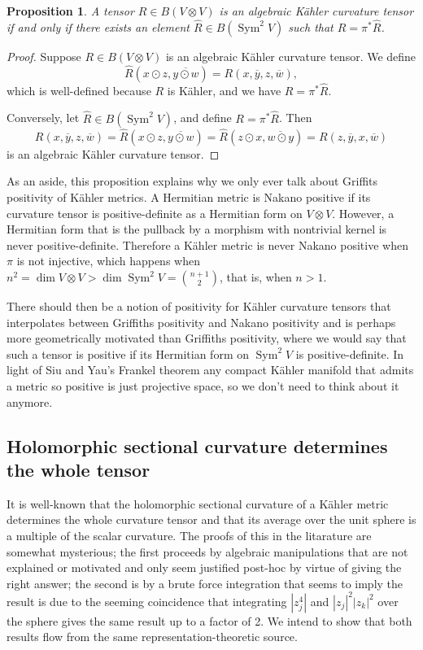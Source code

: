 \documentclass[10pt,a4paper]{amsart}
\newtheorem{prop}[theo]{Proposition}
\theoremstyle{definition}
\def\ov#1{\overline{#1}}
\DeclareMathOperator{\Sym}{Sym}
\begin{document}
\begin{prop}
A tensor $R \in B(V \otimes V)$ is an algebraic K\"ahler curvature tensor
if and only if there exists an element $\hat R \in B(\Sym^2 V)$ such that $R =
\pi^* \hat R$.
\end{prop}

\begin{proof}
Suppose $R \in B(V \otimes V)$ is an algebraic K\"ahler curvature tensor.
We define
$$
\hat R(x \odot z, \ov{y \odot w})
= R(x, \ov y, z, \ov w),
$$
which is well-defined because $R$ is K\"ahler, and we have $R = \pi^* \hat R$.

Conversely, let $\hat R \in B(\Sym^2 V)$, and define $R = \pi^* \hat R$.
Then
$$
R(x, \ov y, z, \ov w)
= \hat R(x \odot z, \ov{y \odot w})
= \hat R(z \odot x, \ov{w \odot y})
= R(z, \ov y, x, \ov w)
$$
is an algebraic K\"ahler curvature tensor.
\end{proof}

As an aside, this proposition explains why we only ever talk about Griffits
positivity of K\"ahler metrics.
A Hermitian metric is Nakano positive if its curvature tensor is
positive-definite as a Hermitian form on $V \otimes V$.
However, a Hermitian form that is the pullback by a morphism with nontrivial
kernel is never positive-definite.
Therefore a K\"ahler metric is never Nakano positive when $\pi$ is not
injective, which happens when
$n^2 = \dim V \otimes V > \dim \Sym^2 V = \binom {n+1}2$,
that is, when $n > 1$.

There should then be a notion of positivity for K\"ahler curvature tensors that
interpolates between Griffiths positivity and Nakano positivity and is perhaps
more geometrically motivated than Griffiths positivity, where we would say that
such a tensor is positive if its Hermitian form on $\Sym^2 V$ is
positive-definite.
In light of Siu and Yau's Frankel theorem any compact K\"ahler manifold that
admits a metric so positive is just projective space, so we don't need to think
about it anymore.



\subsection*{Holomorphic sectional curvature determines the whole tensor}

It is well-known that the holomorphic sectional curvature of a K\"ahler metric
determines the whole curvature tensor and that its average over the unit sphere
is a multiple of the scalar curvature.
The proofs of this in the litarature are somewhat mysterious;
the first proceeds by algebraic manipulations that are not explained or
motivated and only seem justified post-hoc by virtue of giving the right answer;
the second is by a brute force integration that seems to imply the result is
due to the seeming coincidence that integrating $|z_j^4|$ and $|z_j|^2 |z_k|^2$
over the sphere gives the same result up to a factor of 2.
We intend to show that both results flow from the same representation-theoretic
source.
\end{document}
